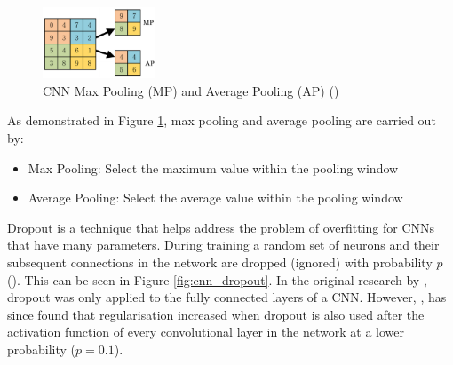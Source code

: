 


\begin{figure}[ht!]
\centering
\includegraphics[width=0.30\textwidth]{media/literature/machine_learning/ml_pooling.png}
\caption[Diagram of CNN Max Pooling and Average Pooling ]{\acrshort{CNN} Max Pooling (MP) and Average Pooling (AP) (\cite{wang_pooling_2018})}
\label{fig:cnn_pooling}
\end{figure}

As demonstrated in Figure \ref{fig:cnn_pooling}, max pooling and average pooling are carried out by:

\begin{itemize}
    \item Max Pooling: Select the maximum value within the pooling window
    \item Average Pooling: Select the average value within the pooling window
\end{itemize}

Dropout is a technique that helps address the problem of overfitting for \acrshort{CNN}s that have many parameters. During training a random set of neurons and their subsequent connections in the network are dropped (ignored) with probability $p$ (\cite{srivastava_dropout_2014}). This can be seen in Figure \ref{fig:cnn_dropout}. In the original research by \cite{hinton_dropout_2012}, dropout was only applied to the fully connected layers of a \acrshort{CNN}. However, \cite{lai_dropout_2017}, has since found that regularisation increased when dropout is also used after the activation function of every convolutional layer in the network at a lower probability ($p = 0.1$).

